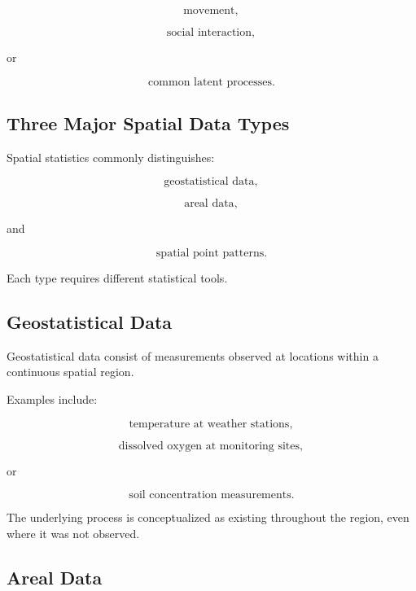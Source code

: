 \[
\boxed{
\text{movement},
}
\]

\[
\boxed{
\text{social interaction},
}
\]

or

\[
\boxed{
\text{common latent processes}.
}
\]

\subsection{Three Major Spatial Data Types}
\label{subsec:three-spatial-data-types}

Spatial statistics commonly distinguishes:

\[
\boxed{
\text{geostatistical data},
}
\]

\[
\boxed{
\text{areal data},
}
\]

and

\[
\boxed{
\text{spatial point patterns}.
}
\]

Each type requires different statistical tools.

\subsection{Geostatistical Data}
\label{subsec:geostatistical-data}

Geostatistical data consist of measurements observed at locations within
a continuous spatial region.

Examples include:

\[
\boxed{
\text{temperature at weather stations},
}
\]

\[
\boxed{
\text{dissolved oxygen at monitoring sites},
}
\]

or

\[
\boxed{
\text{soil concentration measurements}.
}
\]

The underlying process is conceptualized as existing throughout the
region, even where it was not observed.

\subsection{Areal Data}
\label{subsec:areal-data}

